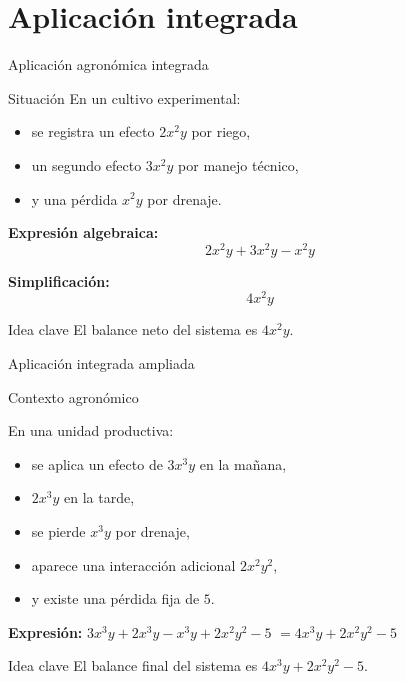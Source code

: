 \documentclass[handout,aspectratio=169,12pt]{beamer}
\newcommand{\IdeaClave}[1]{
	\begin{alertblock}{Idea clave}
		#1
	\end{alertblock}
}
\newcommand{\Agronomia}[1]{
	\begin{exampleblock}{Contexto agronómico}
		#1
	\end{exampleblock}
}
\begin{document}
	\section{Aplicación integrada}
	\begin{frame}{Aplicación agronómica integrada}
		\begin{block}{Situación}
			En un cultivo experimental:
			\begin{itemize}
				\item se registra un efecto \(2x^2y\) por riego,
				\pause
				\item un segundo efecto \(3x^2y\) por manejo técnico,
				\pause
				\item y una pérdida \(x^2y\) por drenaje.
			\end{itemize}
		\end{block}
		
		\pause
		\textbf{Expresión algebraica:}
		\[
		2x^2y + 3x^2y - x^2y
		\]
		
		\pause
		\textbf{Simplificación:}
		\[
		4x^2y
		\]
		
		\pause
		\IdeaClave{El balance neto del sistema es \(4x^2y\).}
	\end{frame}
	
	\begin{frame}{Aplicación integrada ampliada}
		\small
		\Agronomia{
			En una unidad productiva:
			\begin{itemize}
				\item se aplica un efecto de \(3x^3y\) en la mañana,
				\pause
				\item \(2x^3y\) en la tarde,
				\pause
				\item se pierde \(x^3y\) por drenaje,
				\pause
				\item aparece una interacción adicional \(2x^2y^2\),
				\pause
				\item y existe una pérdida fija de \(5\).
			\end{itemize}
		}
		
		\pause
		\textbf{Expresión:} \quad $3x^3y + 2x^3y - x^3y + 2x^2y^2 - 5$\pause
		$= 4x^3y + 2x^2y^2 - 5$
		
		\pause
		\IdeaClave{El balance final del sistema es \(4x^3y + 2x^2y^2 - 5\).}
	\end{frame}
	
\end{document}
